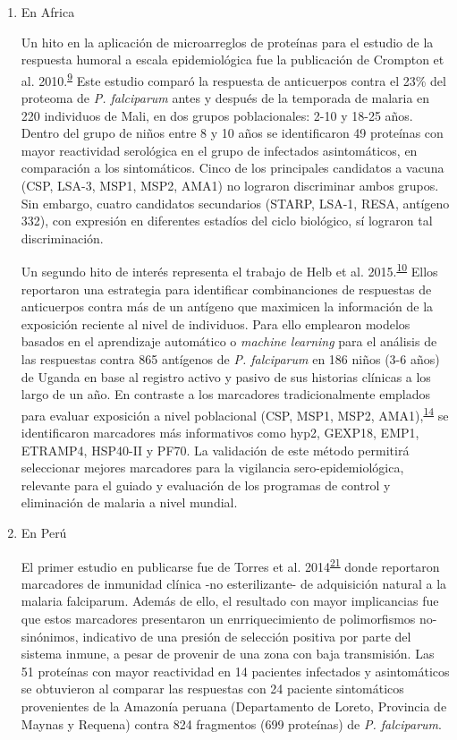 \documentclass[]{article}
\begin{document}
\begin{enumerate}
\def\labelenumi{\alph{enumi}.}
\item
  En Africa

  Un hito en la aplicación de microarreglos de proteínas para el estudio
  de la respuesta humoral a escala epidemiológica fue la publicación de
  Crompton et al.
  2010.\textsuperscript{\protect\hyperlink{ref-crompton2010}{9}} Este
  estudio comparó la respuesta de anticuerpos contra el 23\% del
  proteoma de \emph{P. falciparum} antes y después de la temporada de
  malaria en 220 individuos de Mali, en dos grupos poblacionales: 2-10 y
  18-25 años. Dentro del grupo de niños entre 8 y 10 años se
  identificaron 49 proteínas con mayor reactividad serológica en el
  grupo de infectados asintomáticos, en comparación a los sintomáticos.
  Cinco de los principales candidatos a vacuna (CSP, LSA-3, MSP1, MSP2,
  AMA1) no lograron discriminar ambos grupos. Sin embargo, cuatro
  candidatos secundarios (STARP, LSA-1, RESA, antígeno 332), con
  expresión en diferentes estadíos del ciclo biológico, sí lograron tal
  discriminación.

  Un segundo hito de interés representa el trabajo de Helb et al.
  2015.\textsuperscript{\protect\hyperlink{ref-Helb2015exposure}{10}}
  Ellos reportaron una estrategia para identificar combinanciones de
  respuestas de anticuerpos contra más de un antígeno que maximicen la
  información de la exposición reciente al nivel de individuos. Para
  ello emplearon modelos basados en el aprendizaje automático o
  \emph{machine learning} para el análisis de las respuestas contra 865
  antígenos de \emph{P. falciparum} en 186 niños (3-6 años) de Uganda en
  base al registro activo y pasivo de sus historias clínicas a los largo
  de un año. En contraste a los marcadores tradicionalmente emplados
  para evaluar exposición a nivel poblacional (CSP, MSP1, MSP2,
  AMA1),\textsuperscript{\protect\hyperlink{ref-elliott2014}{14}} se
  identificaron marcadores más informativos como hyp2, GEXP18, EMP1,
  ETRAMP4, HSP40-II y PF70. La validación de este método permitirá
  seleccionar mejores marcadores para la vigilancia sero-epidemiológica,
  relevante para el guiado y evaluación de los programas de control y
  eliminación de malaria a nivel mundial.
\item
  En Perú

  El primer estudio en publicarse fue de Torres et al.
  2014\textsuperscript{\protect\hyperlink{ref-Torres2014asymptomatic}{21}}
  donde reportaron marcadores de inmunidad clínica -no esterilizante- de
  adquisición natural a la malaria falciparum. Además de ello, el
  resultado con mayor implicancias fue que estos marcadores presentaron
  un enrriquecimiento de polimorfismos no-sinónimos, indicativo de una
  presión de selección positiva por parte del sistema inmune, a pesar de
  provenir de una zona con baja transmisión. Las 51 proteínas con mayor
  reactividad en 14 pacientes infectados y asintomáticos se obtuvieron
  al comparar las respuestas con 24 paciente sintomáticos provenientes
  de la Amazonía peruana (Departamento de Loreto, Provincia de Maynas y
  Requena) contra 824 fragmentos (699 proteínas) de \emph{P.
  falciparum}.


\end{enumerate}
\end{document}
